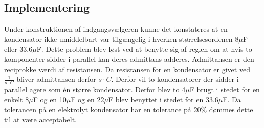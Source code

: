 \subsection{Implementering}
Under konstruktionen af indgangsvælgeren kunne det konstateres at en kondensator ikke umiddelbart var tilgængelig i hverken størrelsesordenen 8$\mu$F eller 33,6$\mu$F. Dette problem blev løst ved at benytte sig af reglen om at hvis to komponenter sidder i parallel kan deres admittans adderes. Admittansen er den reciprokke værdi af resistansen. Da resistansen for en kondensator er givet ved $\frac{1}{s\cdot C}$ bliver admittansen derfor $s\cdot C$. Derfor vil to kondensatorer der sidder i parallel agere som én større kondensator. Derfor blev to 4$\mu$F brugt i stedet for en enkelt 8$\mu$F og en 10$\mu$F og en 22$\mu$F blev benyttet i stedet for en 33.6$\mu$F. Da tolerancen på en elektrolyt kondensator har en tolerance på 20\%  dømmes dette til at være acceptabelt.
